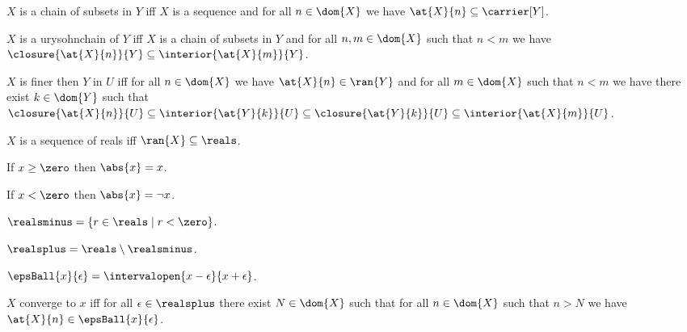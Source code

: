 \begin{definition}\label{chain_of_subsets}
    $X$ is a chain of subsets in $Y$ iff $X$ is a sequence and for all $n \in \dom{X}$ we have $\at{X}{n} \subseteq \carrier[Y]$. 
\end{definition}


\begin{definition}\label{urysohnchain}%
    $X$ is a urysohnchain of $Y$ iff $X$ is a chain of subsets in $Y$ and for all $n,m \in \dom{X}$ such that $n < m$ we have $\closure{\at{X}{n}}{Y} \subseteq \interior{\at{X}{m}}{Y}$.
\end{definition}


\begin{definition}\label{finer} %
    $X$ is finer then $Y$ in $U$ iff for all $n \in \dom{X}$ we have $\at{X}{n} \in \ran{Y}$ and for all $m \in \dom{X}$ such that $n < m$ we have there exist $k \in \dom{Y}$ such that $ \closure{\at{X}{n}}{U} \subseteq \interior{\at{Y}{k}}{U} \subseteq \closure{\at{Y}{k}}{U} \subseteq \interior{\at{X}{m}}{U}$.
\end{definition}


\begin{definition}\label{sequence_of_reals}
    $X$ is a sequence of reals iff $\ran{X} \subseteq \reals$.
\end{definition}


\begin{axiom}\label{abs_behavior1}
    If $x \geq \zero$ then $\abs{x} = x$.
\end{axiom}

\begin{axiom}\label{abs_behavior2}
    If $x < \zero$ then $\abs{x} = \neg{x}$.
\end{axiom}

\begin{definition}\label{realsminus}
    $\realsminus = \{r \in \reals \mid r < \zero\}$.
\end{definition}

\begin{definition}\label{realsplus}
    $\realsplus = \reals \setminus \realsminus$.
\end{definition}

\begin{definition}\label{epsilon_ball}
    $\epsBall{x}{\epsilon} = \intervalopen{x-\epsilon}{x+\epsilon}$.
\end{definition}

\begin{definition}\label{pointwise_convergence}
    $X$ converge to $x$ iff for all $\epsilon \in \realsplus$ there exist $N \in \dom{X}$ such that for all $n \in \dom{X}$ such that $n > N$ we have $\at{X}{n} \in \epsBall{x}{\epsilon}$.
\end{definition}


